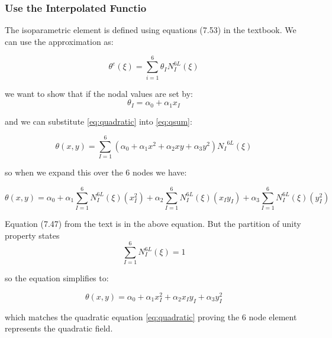 \documentclass{article}
\begin{document}
\subsubsection*{Use the Interpolated Functio}
The isoparametric element is defined using equations (7.53) in the textbook. We can use the approximation as:

\begin{equation}
    \theta^{e}(\xi) = \sum_{i=1}^{6} \theta_I N_I^{6L}(\xi)
    \label{eq:qsum}
\end{equation}

we want to show that if the nodal values are set by:
\begin{equation}
    \theta_I = \alpha_0 + \alpha_1 x_I
    \label{eq:theta}
\end{equation}

and we can substitute \ref{eq:quadratic} into \ref{eq:qsum}:

\begin{equation*}
    \theta(x,y) = \sum_{I=1}^{6} (\alpha_0 + \alpha_1 x^2 +\alpha_2 x y + \alpha_3 y^2) {N_I}^{6L}(\xi)
\end{equation*}

so when we expand this over the 6 nodes we have:

\begin{equation*}
    \theta(x,y) = \alpha_0 + \alpha_1 \sum_{I=1}^{6}N_I^{6L}(\xi)(x_I^2) +\alpha_2 \sum_{I=1}^{6}N_I^{6L}(\xi)(x_I y_I)  + \alpha_3 \sum_{I=1}^{6}N_I^{6L}(\xi)(y_I^2)
\end{equation*}

Equation (7.47) from the text is in the above equation. But the partition of unity property states
\[
    \sum_{I=1}^{6} N_{I}^{6L}(\xi) = 1
\]

so the equation simplifies to:

\begin{equation*}
    \theta(x,y) = \alpha_0 + \alpha_1 x_I^2 +\alpha_2 x_I y_I + \alpha_3 y_I^2
\end{equation*}

which matches the quadratic equation \ref{eq:quadratic} proving the 6 node element represents the quadratic field.
\end{document}
